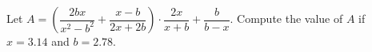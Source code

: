 Let $A=\left(\dfrac{2bx}{x^{2}-b^{2}}+\dfrac{x-b}{2x+2b}\right)\cdot\dfrac{2x}{x+b}+\dfrac{b}{b-x}$. Compute the value of $A$ if $x=3.14$ and $b=2.78$.

